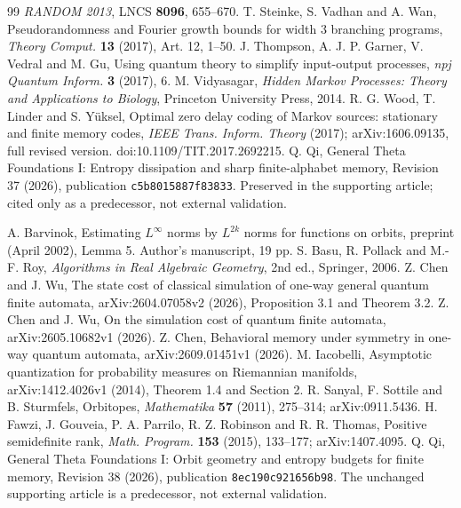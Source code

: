 \begin{thebibliography}{99}
\emph{RANDOM 2013}, LNCS \textbf{8096}, 655--670.
 T. Steinke, S. Vadhan and A. Wan,
Pseudorandomness and Fourier growth bounds for width 3 branching programs,
\emph{Theory Comput.} \textbf{13} (2017), Art. 12, 1--50.
 J. Thompson, A. J. P. Garner, V. Vedral and M. Gu,
Using quantum theory to simplify input-output processes,
\emph{npj Quantum Inform.} \textbf{3} (2017), 6.
 M. Vidyasagar,
\emph{Hidden Markov Processes: Theory and Applications to Biology},
Princeton University Press, 2014.
 R. G. Wood, T. Linder and S. Y\"uksel,
Optimal zero delay coding of Markov sources: stationary and finite memory codes,
\emph{IEEE Trans. Inform. Theory} (2017);
arXiv:1606.09135, full revised version.
doi:10.1109/TIT.2017.2692215.
 Q. Qi,
General Theta Foundations I: Entropy dissipation and sharp finite-alphabet memory,
Revision 37 (2026), publication \texttt{c5b8015887f83833}.
Preserved in the supporting article; cited only as a predecessor, not external validation.

 A. Barvinok,
Estimating $L^\infty$ norms by $L^{2k}$ norms for functions on orbits,
preprint (April 2002), Lemma 5. Author's manuscript, 19 pp.
 S. Basu, R. Pollack and M.-F. Roy,
\emph{Algorithms in Real Algebraic Geometry}, 2nd ed., Springer, 2006.
 Z. Chen and J. Wu,
The state cost of classical simulation of one-way general quantum finite automata,
arXiv:2604.07058v2 (2026), Proposition 3.1 and Theorem 3.2.
 Z. Chen and J. Wu,
On the simulation cost of quantum finite automata,
arXiv:2605.10682v1 (2026).
 Z. Chen,
Behavioral memory under symmetry in one-way quantum automata,
arXiv:2609.01451v1 (2026).
 M. Iacobelli,
Asymptotic quantization for probability measures on Riemannian manifolds,
arXiv:1412.4026v1 (2014), Theorem 1.4 and Section 2.
 R. Sanyal, F. Sottile and B. Sturmfels,
Orbitopes, \emph{Mathematika} \textbf{57} (2011), 275--314;
arXiv:0911.5436.
 H. Fawzi, J. Gouveia, P. A. Parrilo, R. Z. Robinson and R. R. Thomas,
Positive semidefinite rank, \emph{Math. Program.} \textbf{153} (2015), 133--177;
arXiv:1407.4095.
 Q. Qi,
General Theta Foundations I: Orbit geometry and entropy budgets for finite memory,
Revision 38 (2026), publication \texttt{8ec190c921656b98}.
The unchanged supporting article is a predecessor, not external validation.

\end{thebibliography}
